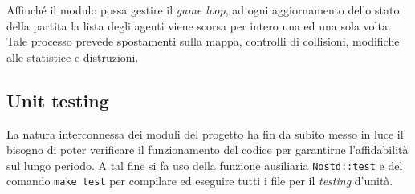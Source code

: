 \documentclass[a4paper]{article}
\begin{document}
Affinch\'e il modulo possa gestire il \emph{game loop}, ad ogni aggiornamento
dello stato della partita la lista degli agenti viene scorsa per intero una ed
una sola volta. Tale processo prevede spostamenti sulla mappa, controlli di
collisioni, modifiche alle statistice e distruzioni.

\subsection{Unit testing}

La natura interconnessa dei moduli del progetto ha fin da subito messo in luce
il bisogno di poter verificare il funzionamento del codice per garantirne
l'affidabilit\`a sul lungo periodo. A tal fine si fa uso della funzione
ausiliaria \verb!Nostd::test! e del comando \verb!make test! per compilare ed
eseguire tutti i file per il \emph{testing} d'unit\`a.
\end{document}
